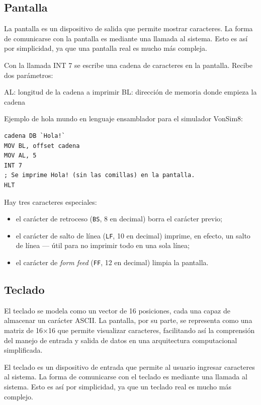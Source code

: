 \documentclass[12pt,oneside]{templates/unerthesis}
\providecommand{\tightlist}{%
  \setlength{\itemsep}{0pt}\setlength{\parskip}{0pt}}
\begin{document}
\hypertarget{pantalla}{%
\subsection{Pantalla}\label{pantalla}}

La pantalla es un dispositivo de salida que permite mostrar caracteres. La forma de comunicarse con la pantalla es mediante una llamada al sistema. Esto es así por simplicidad, ya que una pantalla real es mucho más compleja.

Con la llamada INT 7 se escribe una cadena de caracteres en la pantalla. Recibe dos parámetros:

AL: longitud de la cadena a imprimir
BL: dirección de memoria donde empieza la cadena

Ejemplo de hola mundo en lenguaje ensamblador para el simulador VonSim8:

\begin{lstlisting}
cadena DB `Hola!`
MOV BL, offset cadena
MOV AL, 5
INT 7
; Se imprime Hola! (sin las comillas) en la pantalla.
HLT\end{lstlisting}

Hay tres caracteres especiales:

\begin{itemize}
\tightlist
\item
  el carácter de retroceso (\texttt{BS}, 8 en decimal) borra el carácter previo;
\item
  el carácter de salto de línea (\texttt{LF}, 10 en decimal) imprime, en efecto, un salto de línea --- útil para no imprimir todo en una sola línea;
\item
  el carácter de \emph{form feed} (\texttt{FF}, 12 en decimal) limpia la pantalla.
\end{itemize}

\hypertarget{teclado}{%
\subsection{Teclado}\label{teclado}}

El teclado se modela como un vector de 16 posiciones, cada una capaz de almacenar un carácter ASCII. La pantalla, por su parte, se representa como una matriz de 16×16 que permite visualizar caracteres, facilitando así la comprensión del manejo de entrada y salida de datos en una arquitectura computacional simplificada.

El teclado es un dispositivo de entrada que permite al usuario ingresar caracteres al sistema. La forma de comunicarse con el teclado es mediante una llamada al sistema. Esto es así por simplicidad, ya que un teclado real es mucho más complejo.
\end{document}

